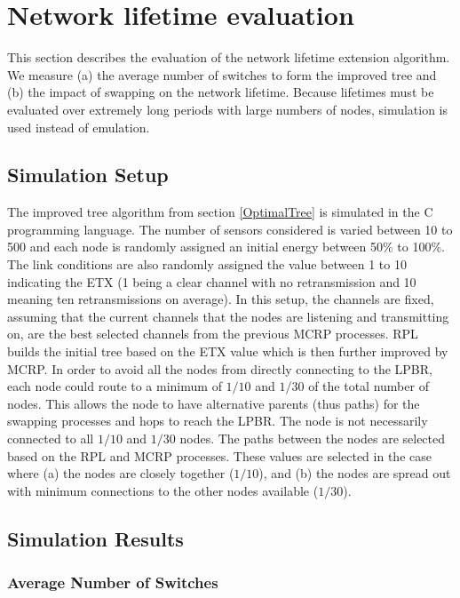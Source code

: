 \section{Network lifetime evaluation}
\label{PerformanceEvaluation}

This section describes the evaluation of the network lifetime extension algorithm.  We measure (a) the average number of switches to form the improved tree and (b) the impact of swapping on the network lifetime.  Because lifetimes must be evaluated over extremely long periods with large numbers of nodes, simulation is used instead of emulation.

\subsection{Simulation Setup}

The improved tree algorithm from section \ref{OptimalTree} is simulated in the C programming language. The number of sensors considered is varied between 10 to 500 and each node is randomly assigned an initial energy between 50\% to 100\%. The link conditions are also randomly assigned the value between 1 to 10 indicating the ETX (1 being a clear channel with no retransmission and 10 meaning ten retransmissions on average). In this setup, the channels are fixed, assuming that the current channels that the nodes are listening and transmitting on, are the best selected channels from the previous MCRP processes. RPL builds the initial tree based on the ETX value which is then further improved by MCRP. In order to avoid all the nodes from directly connecting to the LPBR, each node could route to a minimum of $1/10$ and $1/30$ of the total number of nodes.
This allows the node to have alternative parents (thus paths) for the swapping processes and hops to reach the LPBR. The node is not necessarily connected to all $1/10$ and $1/30$ nodes. The paths between the nodes are selected based on the RPL and MCRP processes. These values are selected in the case where (a) the nodes are closely together ($1/10$), and (b) the nodes are spread out with minimum connections to the other nodes available ($1/30$). 

\subsection{Simulation Results}
\subsubsection{Average Number of Switches}

